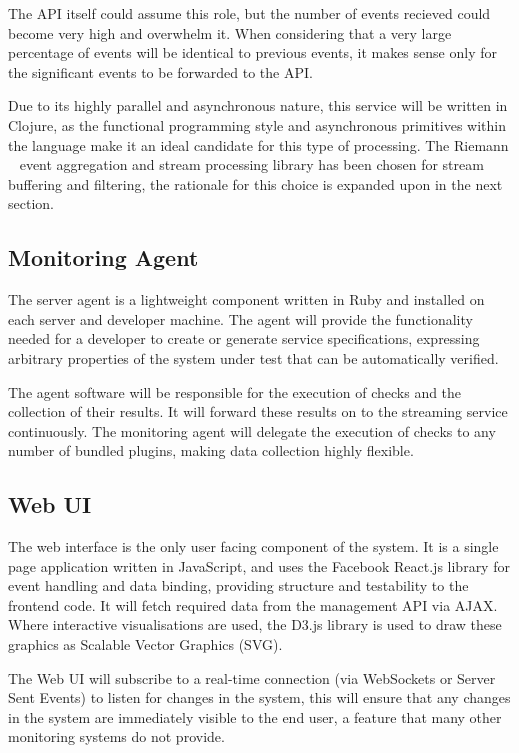 \documentclass{cshonours}
\begin{document}
The API itself could assume this role, but the number of events recieved could become very high and overwhelm it. When considering that a very large percentage of events will be identical to previous events, it makes sense only for the significant events to be forwarded to the API.

Due to its highly parallel and asynchronous nature, this service will be written in Clojure, as the functional programming style and asynchronous primitives within the language make it an ideal candidate for this type of processing. The Riemann ~\cite{Riemann} event aggregation and stream processing library has been chosen for stream buffering and filtering, the rationale for this choice is expanded upon in the next section.

\subsection{Monitoring Agent}

The server agent is a lightweight component written in Ruby and installed on each server and developer machine. The agent will provide the functionality needed for a developer to create or generate service specifications, expressing arbitrary properties of the system under test that can be automatically verified.

The agent software will be responsible for the execution of checks and the collection of their results. It will forward these results on to the streaming service continuously. The monitoring agent will delegate the execution of checks to any number of bundled plugins, making data collection highly flexible.

\subsection{Web UI}

The web interface is the only user facing component of the system. It is a single page application written in JavaScript, and uses the Facebook React.js library for event handling and data binding, providing structure and testability to the frontend code. It will fetch required data from the management API via AJAX. Where interactive visualisations are used, the D3.js library is used to draw these graphics as Scalable Vector Graphics (SVG).

The Web UI will subscribe to a real-time connection (via WebSockets or Server Sent Events) to listen for changes in the system, this will ensure that any changes in the system are immediately visible to the end user, a feature that many other monitoring systems do not provide.
\end{document}
